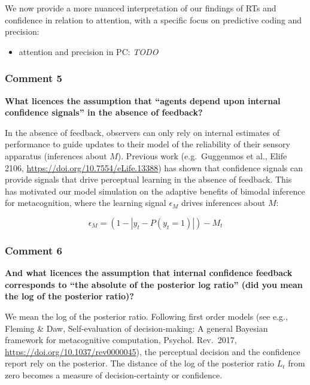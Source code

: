 \documentclass[
]{article}
\providecommand{\tightlist}{%
  \setlength{\itemsep}{0pt}\setlength{\parskip}{0pt}}
\begin{document}
We now provide a more nuanced interpretation of our findings of RTs and
confidence in relation to attention, with a specific focus on predictive
coding and precision:

\begin{itemize}
\tightlist
\item
  attention and precision in PC: \emph{TODO}
\end{itemize}

\hypertarget{comment-5}{%
\subsubsection{Comment 5}\label{comment-5}}

\textbf{What licences the assumption that ``agents depend upon internal
confidence signals'' in the absence of feedback?}

In the absence of feedback, observers can only rely on internal
estimates of performance to guide updates to their model of the
reliability of their sensory apparatus (inferences about \(M\)).
Previous work (e.g.~Guggenmos et al., Elife 2106,
\url{https://doi.org/10.7554/eLife.13388}) has shown that confidence
signals can provide signals that drive perceptual learning in the
absence of feedback. This has motivated our model simulation on the
adaptive benefits of bimodal inference for metacognition, where the
learning signal \(\epsilon_M\) drives inferences about \(M\):

\begin{equation}
\epsilon_M = (1-|y_t - P(y_t = 1)|) - M_t
\end{equation}

\hypertarget{comment-6}{%
\subsubsection{Comment 6}\label{comment-6}}

\textbf{And what licences the assumption that internal confidence
feedback corresponds to ``the absolute of the posterior log ratio'' (did
you mean the log of the posterior ratio)?}

We mean the log of the posterior ratio. Following first order models
(see e.g., Fleming \& Daw, Self-evaluation of decision-making: A general
Bayesian framework for metacognitive computation, Psychol. Rev.~2017,
\url{https://doi.org/10.1037/rev0000045}), the perceptual decision and
the confidence report rely on the posterior. The distance of the log of
the posterior ratio \(L_t\) from zero becomes a measure of
decision-certainty or confidence.
\end{document}
